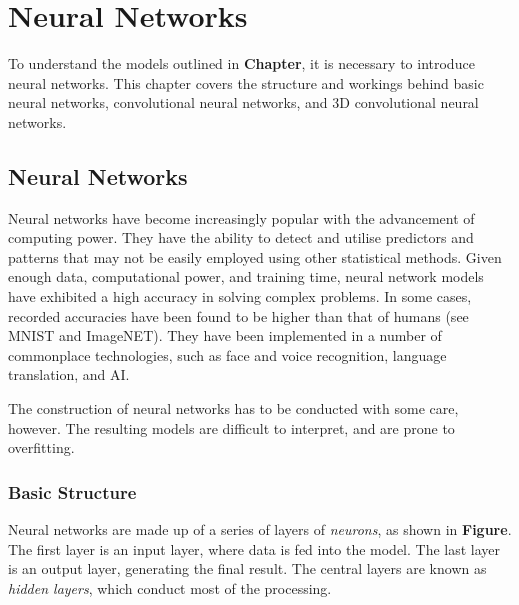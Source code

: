 


\chapter{Neural Networks}\label{neuralNets-intro}

To understand the models outlined in \textbf{Chapter}, it is necessary to introduce neural networks. This chapter covers the structure and workings behind basic neural networks, convolutional neural networks, and 3D convolutional neural networks.

% 
% 

\section{Neural Networks}\label{nnets}

Neural networks have become increasingly popular with the advancement of computing power. They have the ability to detect and utilise predictors and patterns that may not be easily employed using other statistical methods. Given enough data, computational power, and training time, neural network models have exhibited a high accuracy in solving complex problems. In some cases, recorded accuracies have been found to be higher than that of humans (see MNIST and ImageNET). They have been implemented in a number of commonplace technologies, such as face and voice recognition, language translation, and AI.

The construction of neural networks has to be conducted with some care, however. The resulting models are difficult to interpret, and are prone to overfitting. 

\subsection{Basic Structure}\label{nnets-structure}

Neural networks are made up of a series of layers of \textit{neurons}, as shown in \textbf{Figure}. The first layer is an input layer, where data is fed into the model. The last layer is an output layer, generating the final result. The central layers are known as \textit{hidden layers}, which conduct most of the processing.

